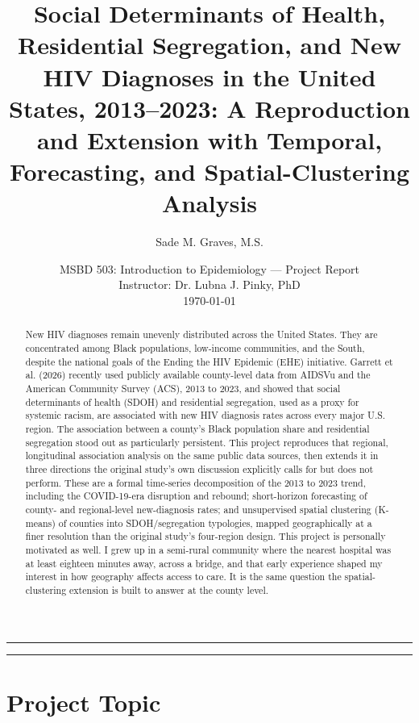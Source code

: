 \documentclass[11pt,letterpaper]{article}
\title{\color{navy}\textbf{Social Determinants of Health, Residential Segregation, and New HIV Diagnoses in the United States, 2013--2023: A Reproduction and Extension with Temporal, Forecasting, and Spatial-Clustering Analysis}}
\author[1]{Sade M. Graves, M.S.}
\affil[1]{School of Applied Computational Sciences, Biomedical Data Science Program, Meharry Medical College}
\date{MSBD 503: Introduction to Epidemiology --- Project Report \\ Instructor: Dr. Lubna J. Pinky, PhD \\ \today}
\begin{document}
\maketitle
\thispagestyle{fancy}

\noindent\textcolor{navy}{\rule{\linewidth}{1.2pt}}

\begin{abstract}
\noindent New HIV diagnoses remain unevenly distributed across the United States. They are concentrated among Black populations, low-income communities, and the South, despite the national goals of the Ending the HIV Epidemic (EHE) initiative. Garrett et al. (2026) recently used publicly available county-level data from AIDSVu and the American Community Survey (ACS), 2013 to 2023, and showed that social determinants of health (SDOH) and residential segregation, used as a proxy for systemic racism, are associated with new HIV diagnosis rates across every major U.S. region. The association between a county's Black population share and residential segregation stood out as particularly persistent. This project reproduces that regional, longitudinal association analysis on the same public data sources, then extends it in three directions the original study's own discussion explicitly calls for but does not perform. These are a formal time-series decomposition of the 2013 to 2023 trend, including the COVID-19-era disruption and rebound; short-horizon forecasting of county- and regional-level new-diagnosis rates; and unsupervised spatial clustering (K-means) of counties into SDOH/segregation typologies, mapped geographically at a finer resolution than the original study's four-region design. This project is personally motivated as well. I grew up in a semi-rural community where the nearest hospital was at least eighteen minutes away, across a bridge, and that early experience shaped my interest in how geography affects access to care. It is the same question the spatial-clustering extension is built to answer at the county level.
\end{abstract}

\vspace{0.6em}
\noindent\textcolor{navy}{\rule{\linewidth}{0.6pt}}
\vspace{0.6em}

\section{Project Topic}
\end{document}
